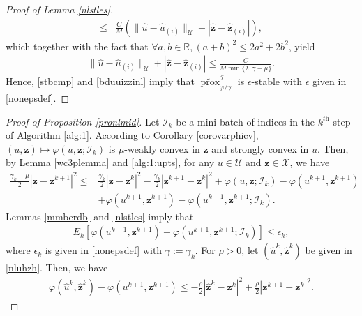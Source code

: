 \documentclass[10pt,reqno]{amsart}
\newcommand{\1}{{\chi}}
\def\leq{\leqslant}
\numberwithin{equation}{section}
\theoremstyle{thmlemcorr}
\numberwithin{theorem}{section}
\theoremstyle{thmlemcorr*}
\theoremstyle{defi}
\theoremstyle{remexample}
\theoremstyle{ass}
\begin{document}
\begin{proof}[Proof of Lemma \ref{nlstles}]
\begin{align}
		\leq & \frac{C}{M}(\|\hat{u}- \hat{u}_{(i)}\|_{\mathcal{U}} + |\hat{\boldsymbol{z}}-\hat{\boldsymbol{z}}_{(i)}|),\nonumber
	\end{align}
	which together with the fact that $\forall a, b \in \mathbb{R}, (a + b)^2 \leq 2a^2 + 2b^2$,  yield
	\begin{align}
		\label{bduuizzinl}
		\|\hat{u}-\hat{u}_{(i)}\|_{\mathcal{U}}+|\hat{\boldsymbol{z}}-\hat{\boldsymbol{z}}_{(i)}| \leq \frac{C}{M\min\{\lambda, \gamma-\mu\}}.
	\end{align}
	Hence,  \eqref{stbcmp} and \eqref{bduuizzinl} imply that $\widetilde{\operatorname{prox}}_{\varphi/\gamma}^{\mathcal{I}}$ is $\epsilon$-stable with $\epsilon$ given in \eqref{nonepsdef}. 
\end{proof}


\begin{proof}[Proof of Proposition \ref{pronlmid}]
	Let $\mathcal{I}_k$ be a mini-batch of indices in the $k^{\textit{th}}$ step of Algorithm \ref{alg:1}. 
	According to Corollary \ref{corovarphicv}, $(u, \boldsymbol{z})\mapsto\varphi(u, \boldsymbol{z}; \mathcal{I}_k)$ is $\mu$-weakly convex in $\boldsymbol{z}$ and strongly convex in $u$. Then, by Lemma \ref{wc3plemma} and \eqref{alg:1:upts}, for any $u\in \mathcal{U}$ and $\boldsymbol{z}\in \mathcal{X}$, we have  
	\begin{align}
		\frac{\gamma_k - \mu}{2}|\boldsymbol{z} - \boldsymbol{z}^{k+1}|^2 \leq 
	& \frac{\gamma_k}{2}|\boldsymbol{z} - \boldsymbol{z}^{k}|^2 - \frac{\gamma_k}{2}|\boldsymbol{z}^{k+1} - \boldsymbol{z}^k|^2 +  \varphi(u, \boldsymbol{z}; {\mathcal{I}}_k) - \varphi(u^{k+1}, \boldsymbol{z}^{k+1})\nonumber \\
		&+ \varphi(u^{k+1}, \boldsymbol{z}^{k+1}) -  \varphi(u^{k+1}, \boldsymbol{z}^{k+1}; {\mathcal{I}}_k). \label{nlzine}
	\end{align}
	Lemmas \ref{mmberdb} and \ref{nlstles} imply that
	\begin{align}
		\label{stb}
		E_k[\varphi(u^{k+1}, \boldsymbol{z}^{k+1}) -  \varphi(u^{k+1}, \boldsymbol{z}^{k+1}; {\mathcal{I}}_k)] \leq \epsilon_k, 
	\end{align}
	where $\epsilon_k$ is given in \eqref{nonepsdef} with $\gamma:=\gamma_k$. 
	For $\rho>0$,  let 	$(\hat{u}^k, \hat{\boldsymbol{z}}^k)$ be given in \eqref{nluhzh}. 
	Then, we have
	\begin{align}
		\label{vpuhzhnlmuk1}
		\varphi(\hat{u}^k, \hat{\boldsymbol{z}}^k) - \varphi(u^{k+1}, \boldsymbol{z}^{k+1}) \leq - \frac{\rho}{2}|\hat{\boldsymbol{z}}^k - \boldsymbol{z}^k|^2 + \frac{\rho}{2}|\boldsymbol{z}^{k+1} - \boldsymbol{z}^k|^2. 

\end{align}
\end{proof}
\end{document}
